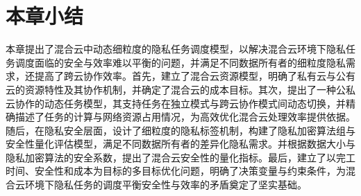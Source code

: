 \section{本章小结}

本章提出了混合云中动态细粒度的隐私任务调度模型，以解决混合云环境下隐私任务调度面临的安全与效率难以平衡的问题，并满足不同数据所有者的细粒度隐私需求，还提高了跨云协作效率。首先，建立了混合云资源模型，明确了私有云与公有云的资源特性及其协作机制，并确定了混合云的成本目标。其次，提出了一种公私云协作的动态任务模型，其支持任务在独立模式与跨云协作模式间动态切换，并精确描述了任务的计算与网络资源占用情况，为高效优化混合云处理效率提供依据。随后，在隐私安全层面，设计了细粒度的隐私标签机制，构建了隐私加密算法组与安全性量化评估模型，满足不同数据所有者的差异化隐私需求。并根据数据大小与隐私加密算法的安全系数，提出了混合云安全性的量化指标。最后，建立了以完工时间、安全性和成本为目标的多目标优化问题，明确了决策变量与约束条件，为混合云环境下隐私任务的调度平衡安全性与效率的矛盾奠定了坚实基础。

